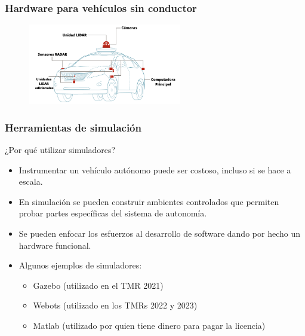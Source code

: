 \begin{frame}\frametitle{Hardware para vehículos sin conductor}
  \begin{figure}
    \centering
    \includegraphics[width=0.6\textwidth]{Figuras/Hardware.png}
  \end{figure}
\end{frame}

\begin{frame}\frametitle{Herramientas de simulación}
  ¿Por qué utilizar simuladores?
  \begin{itemize}
  \item Instrumentar un vehículo autónomo puede ser costoso, incluso si se hace a escala.
  \item En simulación se pueden construir ambientes controlados que permiten probar partes específicas del sistema de autonomía.
  \item Se pueden enfocar los esfuerzos al desarrollo de software dando por hecho un hardware funcional.
  \item Algunos ejemplos de simuladores:
    \begin{itemize}
    \item Gazebo (utilizado en el TMR 2021)
    \item Webots (utilizado en los TMRs 2022 y 2023)
    \item Matlab (utilizado por quien tiene dinero para pagar la licencia)
    \end{itemize}
  \end{itemize}
\end{frame}

